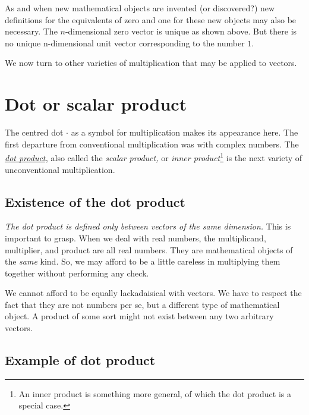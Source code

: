 \documentclass[
  a4paper,
]{article}
\begin{document}
As and when new mathematical objects are invented (or discovered?) new
definitions for the equivalents of zero and one for these new objects
may also be necessary. The \(n\)-dimensional zero vector is unique as
shown above. But there is no unique n-dimensional unit vector
corresponding to the number \(1\).

We now turn to other varieties of multiplication that may be applied to
vectors.

\hypertarget{dot-or-scalar-product}{%
\section{Dot or scalar product}\label{dot-or-scalar-product}}

The centred dot \(\cdot\) as a symbol for multiplication makes its
appearance here. The first departure from conventional multiplication
was with complex numbers. The
\href{http://en.wikipedia.org/wiki/Dot_product}{\emph{dot product,}}
also called the \emph{scalar product,} or \emph{inner
product}\footnote{An inner product is something more general, of which
  the dot product is a special case.} is the next variety of
unconventional multiplication.

\hypertarget{existence-of-the-dot-product}{%
\subsection{Existence of the dot
product}\label{existence-of-the-dot-product}}

\emph{The dot product is defined only between vectors of the same
dimension.} This is important to grasp. When we deal with real numbers,
the multiplicand, multiplier, and product are all real numbers. They are
mathematical objects of the \emph{same} kind. So, we may afford to be a
little careless in multiplying them together without performing any
check.

We cannot afford to be equally lackadaisical with vectors. We have to
respect the fact that they are not numbers per se, but a different type
of mathematical object. A product of some sort might not exist between
any two arbitrary vectors.

\hypertarget{example-of-dot-product}{%
\subsection{Example of dot product}\label{example-of-dot-product}}
\end{document}
